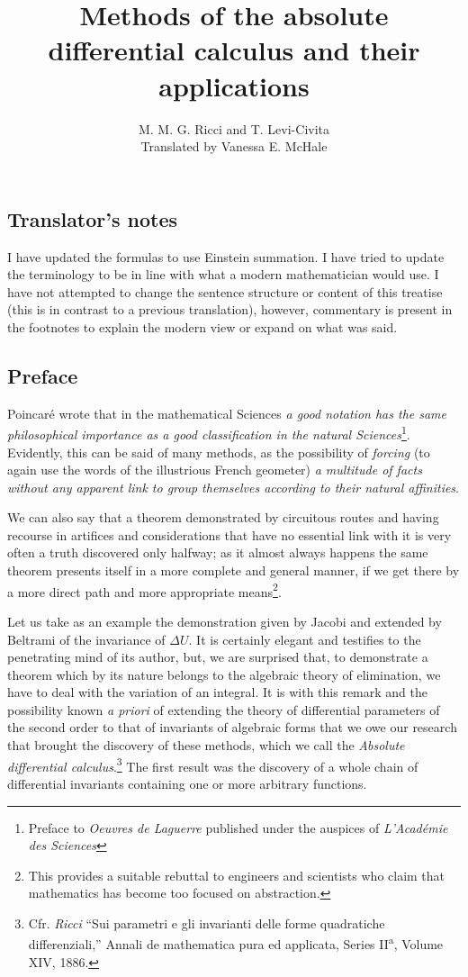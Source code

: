 \documentclass{book}
\begin{document}
\title{Methods of the absolute differential calculus and their applications}
\author{M. M. G. Ricci and T. Levi-Civita\\
Translated by Vanessa E. McHale}
\date{}
\maketitle
\tableofcontents

\subsection*{Translator's notes}
I have updated the formulas to use Einstein summation. I have tried to update the terminology to be in line with what a modern mathematician would use. I have not attempted to change the sentence structure or content of this treatise (this is in contrast to a previous translation), however, commentary is present in the footnotes to explain the modern view or expand on what was said.
\subsection*{Preface}
Poincar\'{e} wrote that in the mathematical Sciences \emph{a good notation has the same philosophical importance as a good classification in the natural Sciences}\footnote{Preface to \emph{Oeuvres de Laguerre} published under the auspices of \emph{L'Acad\'{e}mie des Sciences}}. Evidently, this can be said of many methods, as the possibility of \emph{forcing} (to again use the words of the illustrious French geometer) \emph{a multitude of facts without any apparent link to group themselves according to their natural affinities}.

We can also say that a theorem demonstrated by circuitous routes and having recourse in artifices and considerations that have no essential link with it is very often a truth discovered only halfway; as it almost always happens the same theorem presents itself in a more complete and general manner, if we get there by a more direct path and more appropriate means\footnote{This provides a suitable rebuttal to engineers and scientists who claim that mathematics has become too focused on abstraction.}.

Let us take as an example the demonstration given by Jacobi and extended by Beltrami of the invariance of $\Delta U$. It is certainly elegant and testifies to the penetrating mind of its author, but, we are surprised that, to demonstrate a theorem which by its nature belongs to the algebraic theory of elimination, we have to deal with the variation of an integral. It is with this remark and the possibility known \emph{a priori} of extending the theory of differential parameters of the second order to that of invariants of algebraic forms that we owe our research that brought the discovery of these methods, which we call the \emph{Absolute differential calculus}.\footnote{Cfr. \emph{Ricci} ``Sui parametri e gli invarianti delle forme quadratiche differenziali,'' Annali de mathematica pura ed applicata, Series II\textsuperscript{a}, Volume XIV, 1886.} The first result was the discovery of a whole chain of differential invariants containing one or more arbitrary functions.
\end{document}
